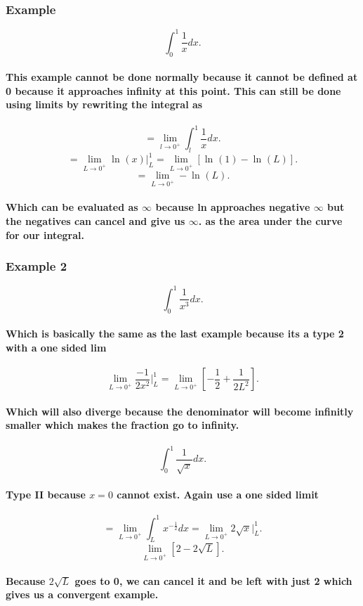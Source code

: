 \documentclass[a4paper]{article}
\begin{document}
\subsubsection{Example}
\[
\int_{0}^{1} \frac{1}{x}dx
.\] 
\paragraph{This example cannot be done normally because it cannot be defined at 0 because it approaches infinity at this point. This can still be done using limits by rewriting the integral as}

\[
 =\lim_{l \to 0^{+}} \int_{l}^{1} \frac{1}{x}dx
.\] 
\[
  =\lim_{L \to 0^{+}}\ln^{}(x)|_{L}^{1}=\lim_{L \to 0^{+}} \left[\ln^{}(1)-\ln^{}(L)\right]
.\] 
\[
=\lim_{L \to 0^{+}} -\ln^{}(L)
.\] 
\paragraph{Which can be evaluated as $\infty$ because ln approaches negative $\infty$ but the negatives can cancel and give us $\infty$. as the area under the curve for our integral.}

\subsubsection{Example 2}
\[
\int_{0}^{1} \frac{1}{x^3}dx
.\] 
\paragraph{Which is basically the same as the last example because its a type 2 with a one sided lim}
\[
  \lim_{L \to 0^{+}} \frac{-1}{2x^2}|_{L}^{1}=\lim_{L \to 0^{+}} \left[-\frac{1}{2}+\frac{1}{2L^2}\right]
.\] 
\paragraph{Which will also diverge because the denominator will become infinitly smaller which makes the fraction go to infinity.}
\newpage

\[
\int_{0}^{1} \frac{1}{\sqrt{x}}dx
.\] 
\paragraph{Type II because $x=0$ cannot exist. Again use a one sided limit}
\[
=\lim_{L \to 0^{+}} \int_{L}^{1} x^{-\frac{1}{2}}dx=\lim_{L \to 0^{+}} 2\sqrt{x}|_{L}^{1}
.\] 
\[
  \lim_{L \to 0^{+}} \left[2-2\sqrt{L}\right]
.\] 
\paragraph{Because $2\sqrt{L}$ goes to 0, we can cancel it and be left with just 2 which gives us a convergent example. }
\end{document}
